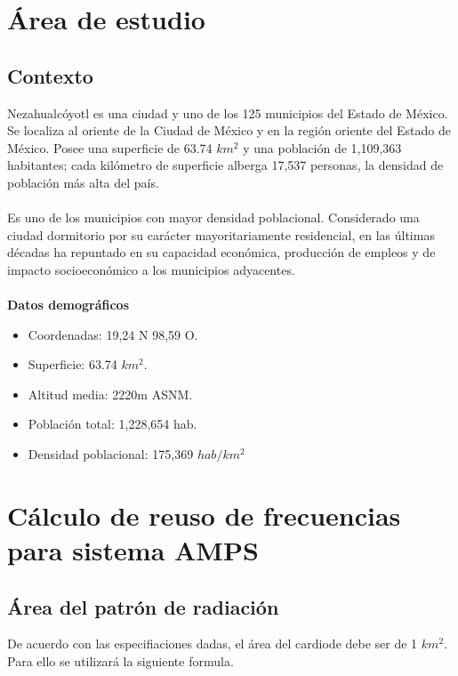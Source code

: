 \documentclass[11pt,letterpaper]{article}
\begin{document}


\newpage
\tableofcontents
\listoffigures
\listoftables

\newpage
\section{Área de estudio}
\subsection{Contexto}
Nezahualcóyotl es una ciudad y uno de los 125 municipios del Estado de México. Se localiza 
al oriente de la Ciudad de México y en la región oriente del Estado de México. Posee una 
superficie de 63.74 $km^2$ y una población de 1,109,363 habitantes; cada kilómetro de 
superficie alberga 17,537 personas, la densidad de población más alta del país.
\\ \\
Es uno de los municipios con mayor densidad poblacional. Considerado una ciudad dormitorio 
por su carácter mayoritariamente residencial, en las últimas décadas ha repuntado en su 
capacidad económica, producción de empleos y de impacto socioeconómico a los municipios 
adyacentes. %
\\ \\
\textbf{Datos demográficos}
\begin{itemize}
    \item Coordenadas: 19,24 N 98,59 O.
    \item Superficie: 63.74 $km^2$.
    \item Altitud media: 2220m ASNM.
    \item Población total: 1,228,654 hab.
    \item Densidad poblacional: 175,369 $hab/km^2$
\end{itemize}

\section{Cálculo de reuso de frecuencias para sistema AMPS}
\subsection{Área del patrón de radiación}
De acuerdo con las especifiaciones dadas, el área del cardiode debe ser de 1 $km^2$. Para ello 
se utilizará la siguiente formula.
\end{document}

